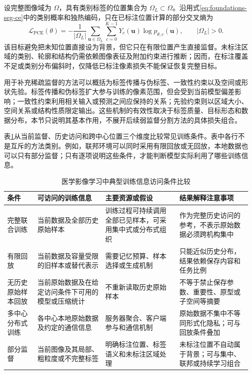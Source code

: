 设完整图像域为 $\Omega$，具有类别标签的位置集合为 $\Omega_L\subset\Omega$。沿用式\eqref{eq:foundations-seg-ce}中的类别概率和独热编码，只在已标注位置计算的部分交叉熵为\cite{lin2016scribblesup,can2018scribble}
\begin{equation}
\mathcal{L}_{\mathrm{PCE}}(\theta)
=
-\frac{1}{|\Omega_L|}
\sum_{\mathbf{u}\in\Omega_L}
\sum_{c=0}^{K-1}
Y_c(\mathbf{u})
\log p_{\theta,c}(\mathbf{u}),
\qquad |\Omega_L|>0 .
\label{eq:foundations-partial-ce}
\end{equation}
该目标避免把未知位置直接设为背景，但它只在有限位置产生直接监督。未标注区域的类别、轮廓和结构仍需依赖图像表征及附加约束进行推断；因而，在标注覆盖不足或类别分布偏斜时，仅降低已标注像素损失不能保证恢复完整目标。

用于补充稀疏监督的方法可以概括为标签传播与伪标签、一致性约束以及空间或形状先验。标签传播和伪标签扩大参与训练的像素范围，但会受到当前模型偏差影响；一致性约束利用相关输入或预测之间应保持的关系；先验约束则以区域大小、空间关系或结构性质限定输出\cite{luo2022scribble,tang2018regularized,kervadec2019constrained}。这些机制的有效性取决于标签质量、目标形态和数据分布，本节只说明其基本作用，不展开后续弱监督分割方法的具体损失组合。

表\ref{tab:foundations-information-access}从当前监督、历史访问和跨中心位置三个维度比较常见训练条件。表中各行不是互斥的方法类别。例如，联邦环境可以同时采用有限回放或无回放，本地数据也可以只有部分监督；只有逐项说明这些条件，才能判断模型实际利用了哪些训练信息。

\begin{table}[htbp]
\centering
\caption{医学影像学习中典型训练信息访问条件比较}
\label{tab:foundations-information-access}
\thesistablefont
\setlength{\tabcolsep}{3pt}
\renewcommand{\arraystretch}{1.18}
\begin{tabular}{
>{\raggedright\arraybackslash}p{2.1cm}
>{\raggedright\arraybackslash}p{3.5cm}
>{\raggedright\arraybackslash}p{3.4cm}
>{\raggedright\arraybackslash}p{4.4cm}}
\toprule
条件 & 可访问的训练信息 & 主要资源或假设 & 结果解释注意事项 \\
\midrule
完整联合训练
& 当前数据及全部历史原始样本
& 训练过程可持续调用全部已见样本，可采用集中式或分布式组织
& 作为完整历史访问的参考，不表示原始数据必须跨机构集中 \\
有限回放
& 当前数据及容量受限的旧样本或替代表示
& 需要记忆预算、样本选择或生成机制
& 只能近似历史分布，结果依赖保存内容和任务比例 \\
无历史原始样本回放
& 当前原始数据及在给定访问条件下可用的模型或压缩统计
& 不重新读取历史原始样本
& 不等于禁止保存参数、重要性、原型或子空间等摘要 \\
多中心分布式训练
& 各中心本地原始数据及约定的通信信息
& 服务器聚合、客户端参与和通信机制
& 原始数据不集中不等同形式化隐私；可与回放条件叠加 \\
部分监督
& 当前图像及其局部、粗粒度或不完整标签
& 明确标注位置、标签语义和未标注区域处理
& 未标注位置不自动属于背景；可与集中、联邦或持续学习组合 \\
\bottomrule
\end{tabular}
\end{table}

